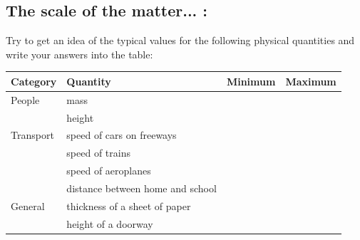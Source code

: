             \subsection*{The scale of the matter... :}
            \nopagebreak
             \label{m30853*uid09832} Try to get an idea of the typical values for the following physical quantities and write your answers into the table:\par 
          \begin{table}[H]
        \begin{center}
      \label{m30853*id67638}
    \noindent
      \begin{tabular}{|l|l|l|l|}\hline
                \textbf{Category}
               &
                \textbf{Quantity}
               &
                \textbf{Minimum}
               &
                \textbf{Maximum}
              \\ \hline
        People &
        mass &
         &
        \\ \hline
         &
        height &
         &
        \\ \hline
        Transport &
        speed of cars on freeways &
         &
       \\ \hline
         &
        speed of trains &
         &
        \\ \hline
         &
        speed of aeroplanes &
         &
       \\ \hline
         &
        distance between home and school &
         &
        \\ \hline
        General &
        thickness of a sheet of paper &
         &
        \\ \hline
         &
        height of a doorway &
         &
       \\ \hline
    \end{tabular}
      \end{center}
\end{table}
    \par
